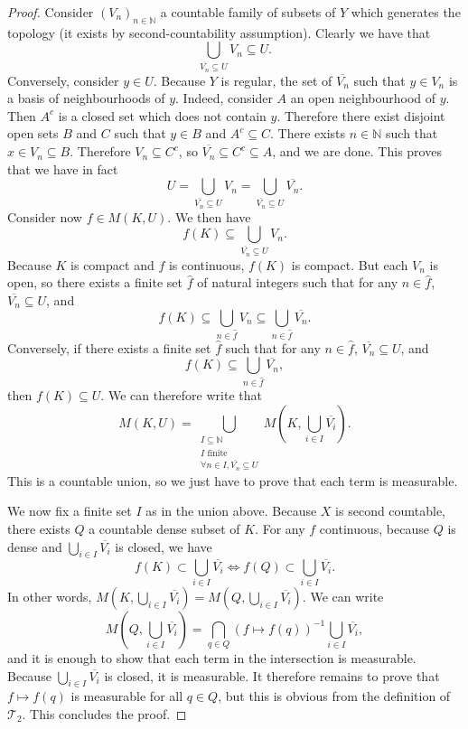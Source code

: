 \begin{proof}
Consider $(V_n)_{n \in \mathbb{N}}$ a countable family of subsets of $Y$ which generates the topology (it exists by second-countability assumption). Clearly we have that
$$\bigcup_{\overline{V_n} \subseteq U} V_n \subseteq U.$$
Conversely, consider $y \in U$. Because $Y$ is regular, the set of $\overline{V_n}$ such that $y \in V_n$ is a basis of neighbourhoods of $y$. Indeed, consider $A$ an open neighbourhood of $y$. Then $A^c$ is a closed set which does not contain $y$. Therefore there exist disjoint open sets $B$ and $C$ such that $y \in B$ and $A^c \subseteq C$. There exists $n \in \mathbb{N}$ such that $x \in V_n \subseteq B$. Therefore $V_n \subseteq C^c$, so $\overline{V_n} \subseteq C^c \subseteq A$, and we are done. This proves that we have in fact
$$U = \bigcup_{\overline{V_n} \subseteq U} V_n = \bigcup_{\overline{V_n} \subseteq U} \overline{V_n}.$$
Consider now $f \in M(K, U)$. We then have
$$f(K) \subseteq \bigcup_{\overline{V_n} \subseteq U} V_n.$$
Because $K$ is compact and $f$ is continuous, $f(K)$ is compact. But each $V_n$ is open, so there exists a finite set $\hat{f}$ of natural integers such that for any $n \in \hat{f}$, $\overline{V_n} \subseteq U$, and
$$f(K) \subseteq \bigcup_{n \in \hat{f}} V_n \subseteq \bigcup_{n \in \hat{f}} \overline{V_n}.$$
Conversely, if there exists a finite set $\hat{f}$ such that for any $n \in \hat{f}$, $\overline{V_n} \subseteq U$, and
$$f(K) \subseteq \bigcup_{n \in \hat{f}} \overline{V_n},$$
then $f(K) \subseteq U$. We can therefore write that
$$M(K, U) = \bigcup_{\substack{I \subseteq \mathbb{N} \\ I \text{ finite} \\ \forall n \in I, \overline{V_n} \subseteq U}} M\left(K, \bigcup_{i \in I} \overline{V_i}\right).$$
This is a countable union, so we just have to prove that each term is measurable.

We now fix a finite set $I$ as in the union above. Because $X$ is second countable, there exists $Q$ a countable dense subset of $K$. For any $f$ continuous, because $Q$ is dense and $\bigcup_{i \in I} \overline{V_i}$ is closed, we have
$$f(K) \subset \bigcup_{i \in I} \overline{V_i} \Longleftrightarrow f(Q) \subset \bigcup_{i \in I} \overline{V_i}.$$
In other words, $M\left(K, \bigcup_{i \in I} \overline{V_i}\right) = M\left(Q, \bigcup_{i \in I} \overline{V_i}\right)$. We can write
$$M\left(Q, \bigcup_{i \in I} \overline{V_i}\right) = \bigcap_{q \in Q} (f \mapsto f(q))^{-1} \bigcup_{i \in I} \overline{V_i},$$
and it is enough to show that each term in the intersection is measurable. Because $\bigcup_{i \in I} \overline{V_i}$ is closed, it is measurable. It therefore remains to prove that $f \mapsto f(q)$ is measurable for all $q \in Q$, but this is obvious from the definition of $\mathcal{T}_2$. This concludes the proof.
\end{proof}


